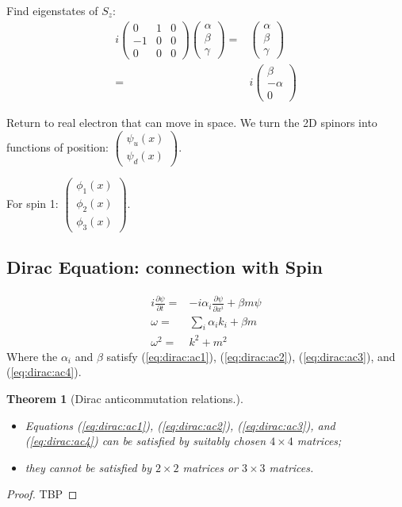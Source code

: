 \documentclass[]{article}
\newtheorem{thm}{Theorem}
\begin{document}
Find eigenstates of $S_z$:
\begin{align*}
	i \begin{pmatrix}
		0&1&0\\
		-1&0&0\\
		0&0&0
	\end{pmatrix}\begin{pmatrix}
		\alpha\\
		\beta\\
		\gamma
	\end{pmatrix}=&\begin{pmatrix}
		\alpha\\
		\beta\\
		\gamma
	\end{pmatrix}\\
	=&i\begin{pmatrix}
		\beta\\
		-\alpha\\
		0
	\end{pmatrix}
\end{align*}

Return to real electron that can move in space. We turn the 2D spinors into functions of position: $\begin{pmatrix}
\psi_u(x)\\
\psi_d(x)
\end{pmatrix}$.

For spin 1: $\begin{pmatrix}
\phi_1(x)\\
\phi_2(x)\\
\phi_3(x)
\end{pmatrix}$.

\subsection{Dirac Equation: connection with Spin}

\begin{align*}
	i \frac{\partial \psi}{\partial t} =& - i \alpha_i \frac{\partial \psi}{\partial x^i} + \beta m \psi\\
	\omega =& \sum_i \alpha_i k_i + \beta m\\
	\omega^2 =& k^2 + m^2
\end{align*}
Where the $\alpha_i$ and $\beta$ satisfy (\ref{eq:dirac:ac1}), (\ref{eq:dirac:ac2}), (\ref{eq:dirac:ac3}), and (\ref{eq:dirac:ac4}).


\begin{thm}[Dirac anticommutation relations.]\label{thm:dirac:anticommutation} 
	\begin{itemize}
		\item Equations (\ref{eq:dirac:ac1}), (\ref{eq:dirac:ac2}), (\ref{eq:dirac:ac3}), and (\ref{eq:dirac:ac4}) can be satisfied by suitably chosen $4\times4$ matrices;
		\item  they cannot be satisfied by $2 \times 2$ matrices or $3 \times 3$ matrices.
	\end{itemize}
\end{thm}
\begin{proof}
	TBP
\end{proof}
\end{document}
